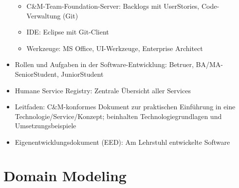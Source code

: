 \begin{itemize}
\begin{itemize}
		\item C\&M-Team-Foundation-Server: Backlogs mit UserStories, Code-Verwaltung (Git)
		\item IDE: Eclipse mit Git-Client
		\item Werkzeuge: MS Office, UI-Werkzeuge, Enterprise Architect
	\end{itemize}
	\item Rollen und Aufgaben in der Software-Entwicklung: Betruer, BA/MA-SeniorStudent, JuniorStudent
	\item Humane Service Registry: Zentrale Übersicht aller Services
	\item Leitfaden: C\&M-konformes Dokument zur praktischen Einführung in eine Technologie/Service/Konzept; beinhalten Technologiegrundlagen und Umsetzungsbeispiele
	\item Eigenentwicklungsdokument (EED): Am Lehrstuhl entwickelte Software
\end{itemize}



\section{Domain Modeling}

